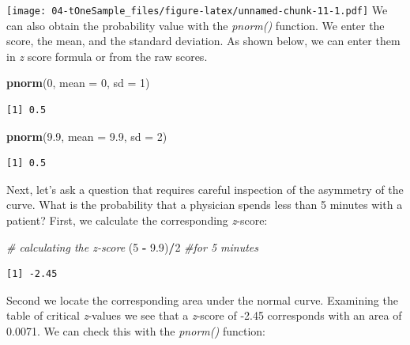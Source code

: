 \documentclass[
  11pt,
]{book}
\newenvironment{Shaded}{\begin{snugshade}}{\end{snugshade}}
\newcommand{\AttributeTok}[1]{\textcolor[rgb]{0.27,0.27,0.27}{#1}}
\newcommand{\CommentTok}[1]{\textcolor[rgb]{0.37,0.37,0.37}{\textit{#1}}}
\newcommand{\DecValTok}[1]{\textcolor[rgb]{0.06,0.06,0.06}{#1}}
\newcommand{\FloatTok}[1]{\textcolor[rgb]{0.06,0.06,0.06}{#1}}
\newcommand{\FunctionTok}[1]{\textcolor[rgb]{0.27,0.27,0.27}{\textbf{#1}}}
\newcommand{\NormalTok}[1]{#1}
\newcommand{\SpecialCharTok}[1]{\textcolor[rgb]{0.43,0.43,0.43}{\textbf{#1}}}
\begin{document}
\texttt{[image: 04-tOneSample\_files/figure-latex/unnamed-chunk-11-1.pdf]} We can also obtain the probability value with the \emph{pnorm()} function. We enter the score, the mean, and the standard deviation. As shown below, we can enter them in \emph{z} score formula or from the raw scores.

\begin{Shaded}
\begin{Highlighting}[]
\FunctionTok{pnorm}\NormalTok{(}\DecValTok{0}\NormalTok{, }\AttributeTok{mean =} \DecValTok{0}\NormalTok{, }\AttributeTok{sd =} \DecValTok{1}\NormalTok{)}
\end{Highlighting}
\end{Shaded}

\begin{verbatim}
[1] 0.5
\end{verbatim}

\begin{Shaded}
\begin{Highlighting}[]
\FunctionTok{pnorm}\NormalTok{(}\FloatTok{9.9}\NormalTok{, }\AttributeTok{mean =} \FloatTok{9.9}\NormalTok{, }\AttributeTok{sd =} \DecValTok{2}\NormalTok{)}
\end{Highlighting}
\end{Shaded}

\begin{verbatim}
[1] 0.5
\end{verbatim}

Next, let's ask a question that requires careful inspection of the asymmetry of the curve. What is the probability that a physician spends less than 5 minutes with a patient? First, we calculate the corresponding \emph{z}-score:

\begin{Shaded}
\begin{Highlighting}[]
\CommentTok{\# calculating the z{-}score}
\NormalTok{(}\DecValTok{5} \SpecialCharTok{{-}} \FloatTok{9.9}\NormalTok{)}\SpecialCharTok{/}\DecValTok{2}  \CommentTok{\#for 5 minutes}
\end{Highlighting}
\end{Shaded}

\begin{verbatim}
[1] -2.45
\end{verbatim}

Second we locate the corresponding area under the normal curve. Examining the table of critical \emph{z}-values we see that a \emph{z}-score of -2.45 corresponds with an area of 0.0071. We can check this with the \emph{pnorm()} function:
\end{document}

